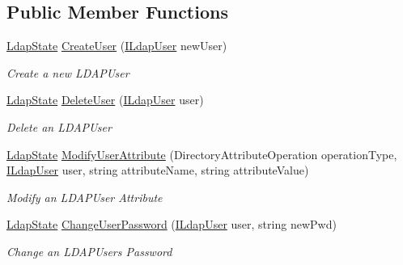 \subsection*{Public Member Functions}
\begin{DoxyCompactItemize}
\item 
\hyperlink{namespace_l_d_a_p_library_1_1_enums_a052eaa58cba3f62d4c008a3b1b347e03}{Ldap\+State} \hyperlink{interface_l_d_a_p_library_1_1_interfarces_1_1_i_ldap_user_manipulator_a6ecd3285856a732113d40b07161140b1}{Create\+User} (\hyperlink{interface_l_d_a_p_library_1_1_interfarces_1_1_i_ldap_user}{I\+Ldap\+User} new\+User)
\begin{DoxyCompactList}\small\item\em Create a new L\+D\+A\+P\+User \end{DoxyCompactList}\item 
\hyperlink{namespace_l_d_a_p_library_1_1_enums_a052eaa58cba3f62d4c008a3b1b347e03}{Ldap\+State} \hyperlink{interface_l_d_a_p_library_1_1_interfarces_1_1_i_ldap_user_manipulator_a8129defc9180daba0d8d5c8b601829f8}{Delete\+User} (\hyperlink{interface_l_d_a_p_library_1_1_interfarces_1_1_i_ldap_user}{I\+Ldap\+User} user)
\begin{DoxyCompactList}\small\item\em Delete an L\+D\+A\+P\+User \end{DoxyCompactList}\item 
\hyperlink{namespace_l_d_a_p_library_1_1_enums_a052eaa58cba3f62d4c008a3b1b347e03}{Ldap\+State} \hyperlink{interface_l_d_a_p_library_1_1_interfarces_1_1_i_ldap_user_manipulator_a6e5ca95b85d2be5e022cbe53513edeb2}{Modify\+User\+Attribute} (Directory\+Attribute\+Operation operation\+Type, \hyperlink{interface_l_d_a_p_library_1_1_interfarces_1_1_i_ldap_user}{I\+Ldap\+User} user, string attribute\+Name, string attribute\+Value)
\begin{DoxyCompactList}\small\item\em Modify an L\+D\+A\+P\+User Attribute \end{DoxyCompactList}\item 
\hyperlink{namespace_l_d_a_p_library_1_1_enums_a052eaa58cba3f62d4c008a3b1b347e03}{Ldap\+State} \hyperlink{interface_l_d_a_p_library_1_1_interfarces_1_1_i_ldap_user_manipulator_a479cc768d15ee607612eb46d1341d090}{Change\+User\+Password} (\hyperlink{interface_l_d_a_p_library_1_1_interfarces_1_1_i_ldap_user}{I\+Ldap\+User} user, string new\+Pwd)
\begin{DoxyCompactList}\small\item\em Change an L\+D\+A\+P\+User\textquotesingle{}s Password \end{DoxyCompactList}\item 

\end{DoxyCompactItemize}
